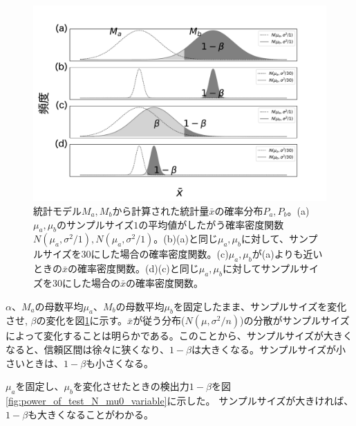 \begin{figure}
    \begin{center}
        \includegraphics[width=15cm]{./image/04_/power_of_a_test_3.pdf}
        \caption{統計モデル$M_a,M_b$から計算された統計量$\bar{x}$の確率分布$P_a,P_b$。(a)$\mu_a,\mu_b$のサンプルサイズ$1$の平均値がしたがう確率密度関数$N(\mu_a,\sigma^2/1),N(\mu_a,\sigma^2/1)$。(b)(a)と同じ$\mu_a,\mu_b$に対して、サンプルサイズを$30$にした場合の確率密度関数。(c)$\mu_a,\mu_b$が(a)よりも近いときの$\bar{x}$の確率密度関数。(d)(c)と同じ$\mu_a,\mu_b$に対してサンプルサイズを$30$にした場合の$\bar{x}$の確率密度関数。}
        \label{fig:power_of_test_alpha_beta_sample_size}
    \end{center}
    \end{figure}

    

$\alpha$、$M_a$の母数平均$\mu_a$、$M_b$の母数平均$\mu_b$を固定したまま、サンプルサイズを変化させ,
$\beta$の変化を図\ref{fig:power_of_test_alpha_beta_sample_size}に示す。$\bar{x}$が従う分布($N(\mu,\sigma^2/n)$)の分散がサンプルサイズによって変化することは明らかである。このことから、サンプルサイズが大きくなると、信頼区間は徐々に狭くなり、$1-\beta$は大きくなる。サンプルサイズが小さいときは、$1-\beta$も小さくなる。

$\mu_a$を固定し、$\mu_b$を変化させたときの検出力$1-\beta$を図\ref{fig:power_of_test_N_mu0_variable}に示した。
サンプルサイズが大きければ、$1-\beta$も大きくなることがわかる。


